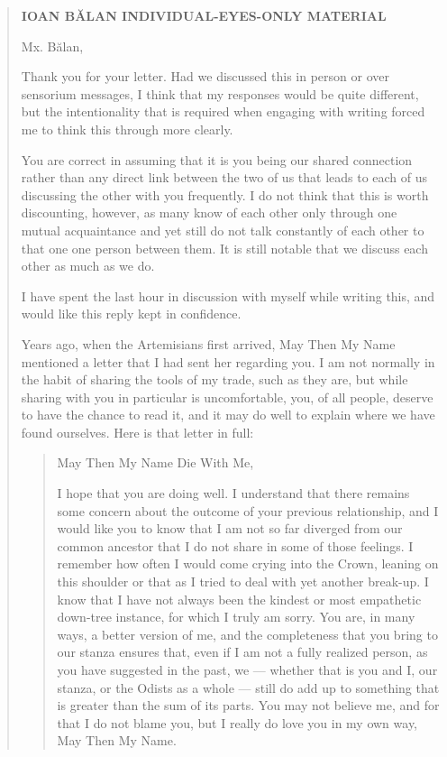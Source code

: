 \begin{quote}
\textbf{IOAN BĂLAN INDIVIDUAL-EYES-ONLY MATERIAL}

Mx. Bălan,

Thank you for your letter. Had we discussed this in person or over sensorium messages, I think that my responses would be quite different, but the intentionality that is required when engaging with writing forced me to think this through more clearly.

You are correct in assuming that it is you being our shared connection rather than any direct link between the two of us that leads to each of us discussing the other with you frequently. I do not think that this is worth discounting, however, as many know of each other only through one mutual acquaintance and yet still do not talk constantly of each other to that one one person between them. It is still notable that we discuss each other as much as we do.

I have spent the last hour in discussion with myself while writing this, and would like this reply kept in confidence.

Years ago, when the Artemisians first arrived, May Then My Name mentioned a letter that I had sent her regarding you. I am not normally in the habit of sharing the tools of my trade, such as they are, but while sharing with you in particular is uncomfortable, you, of all people, deserve to have the chance to read it, and it may do well to explain where we have found ourselves. Here is that letter in full:

\begin{quote}
May Then My Name Die With Me,

I hope that you are doing well. I understand that there remains some concern about the outcome of your previous relationship, and I would like you to know that I am not so far diverged from our common ancestor that I do not share in some of those feelings. I remember how often I would come crying into the Crown, leaning on this shoulder or that as I tried to deal with yet another break-up. I know that I have not always been the kindest or most empathetic down-tree instance, for which I truly am sorry. You are, in many ways, a better version of me, and the completeness that you bring to our stanza ensures that, even if I am not a fully realized person, as you have suggested in the past, we — whether that is you and I, our stanza, or the Odists as a whole — still do add up to something that is greater than the sum of its parts. You may not believe me, and for that I do not blame you, but I really do love you in my own way, May Then My Name.


\end{quote}
\end{quote}
